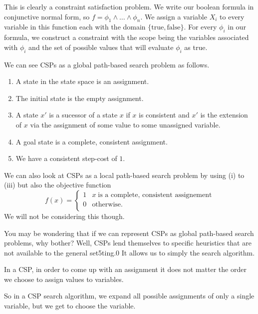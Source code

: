 \begin{example}
    This is clearly a constraint satisfaction problem. 
    We write our boolean formula in conjunctive normal form, so $f = \phi_1 \land \ldots \land \phi_n$. 
    We assign a variable $X_i$ to every variable in this function each with the domain $\{ \text{true}, \text{false}\}$.
    For every $\phi_i$ in our formula, we construct a constraint with the scope being the variables associated with $\phi_i$ and the set of possible values that will evaluate $\phi_i$ as true.
\end{example}

\begin{remark}
    We can see CSPs as a global path-based search problem as follows.
    \begin{enumerate}
        \item A state in the state space is an assignment.
        \item The initial state is the empty assignment.
        \item A state $x'$ is a sucessor of a state $x$ if $x$ is consistent and $x'$ is the extension of $x$ via the assignment of some value to some unassigned variable.
        \item A goal state is a complete, consistent assignment.
        \item We have a consistent step-cost of $1$.
    \end{enumerate}
\end{remark}

\begin{remark}
    We can also look at CSPs as a local path-based search problem by using (i) to (iii) but also the objective function
    \[ f(x) = \begin{cases} 1 & x \;\text{is a complete, consistent assignement} \\ 0 & \text{otherwise}. \\ \end{cases}\]
    We will not be considering this though.
\end{remark}

You may be wondering that if we can represent CSPs as global path-based search problems, why bother? Well, CSPs lend themselves to specific heuristics that are not available to the general set5ting.0 It allows us to simply the search algorithm.

\begin{proposition}[]
    In a CSP, in order to come up with an assignment it does not matter the order we choose to assign values to variables.
\end{proposition}

So in a CSP search algorithm, we expand all possible assignments of only a single variable, but we get to choose the variable.

